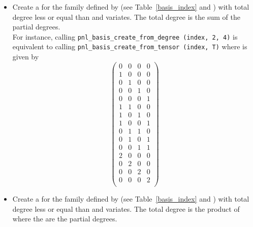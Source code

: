 \begin{itemize}
\item {}
  \sshortdescribe Create a \PnlBasis for the family
  defined by  (see Table~\ref{basis_index} and ) with total degree less
  or equal than  and  variates. The total degree is
  the sum of the partial degrees.\\
  For instance, calling \verb!pnl_basis_create_from_degree (index, 2, 4)! is
  equivalent to calling \verb!pnl_basis_create_from_tensor (index, T)! where
   is given by
  \[ \left(
    \begin{array}{cccc}
      0 & 0 & 0 & 0\\
      1 & 0 & 0 & 0\\
      0 & 1 & 0 & 0\\
      0 & 0 & 1 & 0\\
      0 & 0 & 0 & 1\\
      1 & 1 & 0 & 0\\
      1 & 0 & 1 & 0\\
      1 & 0 & 0 & 1\\
      0 & 1 & 1 & 0\\
      0 & 1 & 0 & 1\\
      0 & 0 & 1 & 1\\
      2 & 0 & 0 & 0\\
      0 & 2 & 0 & 0\\
      0 & 0 & 2 & 0\\
      0 & 0 & 0 & 2\\
    \end{array}
  \right) \]
\item {}
  \sshortdescribe Create a \PnlBasis for the family
  defined by  (see Table~\ref{basis_index} and ) with total degree less
  or equal than  and  variates. The total degree is
  the product of  where the  are the partial degrees.



\end{itemize}
